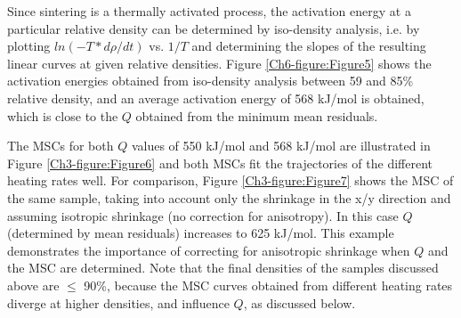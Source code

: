 Since sintering is a thermally activated process, the activation energy at a particular relative density can be determined by iso-density analysis, i.e. by plotting $ln(-T*d\rho/dt)$ vs. $1/T$ and determining the slopes of the resulting linear curves at given relative densities. Figure \ref{Ch6-figure:Figure5} shows the activation energies obtained from iso-density analysis between 59 and 85\% relative density, and an average activation energy of 568 kJ/mol is obtained, which is close to the $Q$ obtained from the minimum mean residuals. 

The MSCs for both $Q$ values of 550 kJ/mol and 568 kJ/mol are illustrated in Figure \ref{Ch3-figure:Figure6} and both MSCs fit the trajectories of the different heating rates well. For comparison, Figure \ref{Ch3-figure:Figure7} shows the MSC of the same sample, taking into account only the shrinkage in the x/y direction and assuming isotropic shrinkage (no correction for anisotropy). In this case $Q$ (determined by mean residuals) increases to 625 kJ/mol. This example demonstrates the importance of correcting for anisotropic shrinkage when $Q$ and the MSC are determined. Note that the final densities of the samples discussed above are $\leq$ 90\%, because the MSC curves obtained from different heating rates diverge at higher densities, and influence $Q$, as discussed below.

